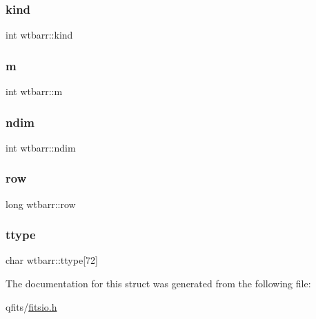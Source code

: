 \subsubsection{\texorpdfstring{kind}{kind}}
{\footnotesize\ttfamily int wtbarr\+::kind}

\mbox{\label{structwtbarr_a1e88ad32570534a006e96cba721489b5}} 
\subsubsection{\texorpdfstring{m}{m}}
{\footnotesize\ttfamily int wtbarr\+::m}

\mbox{\label{structwtbarr_af862b4f90b0406ed8dd0c240768d4bd3}} 
\subsubsection{\texorpdfstring{ndim}{ndim}}
{\footnotesize\ttfamily int wtbarr\+::ndim}

\mbox{\label{structwtbarr_a2ff7c235353320c6dd98951484012ee7}} 
\subsubsection{\texorpdfstring{row}{row}}
{\footnotesize\ttfamily long wtbarr\+::row}

\mbox{\label{structwtbarr_a2376a14a266e1cbe7b27e9f752784ec7}} 
\subsubsection{\texorpdfstring{ttype}{ttype}}
{\footnotesize\ttfamily char wtbarr\+::ttype\mbox{[}72\mbox{]}}



The documentation for this struct was generated from the following file\+:\begin{DoxyCompactItemize}
\item 
qfits/\hyperlink{fitsio_8h}{fitsio.\+h}\end{DoxyCompactItemize}
